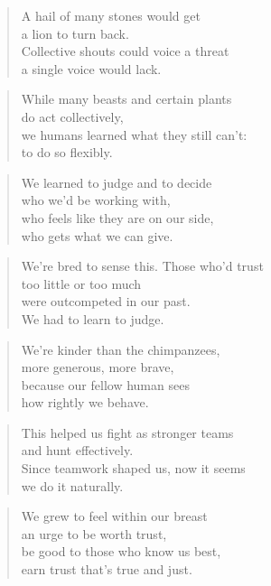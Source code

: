\documentclass[10pt,a4paper]{article}
\begin{document}
\begin{paracol}{2}
\begin{verse}
A hail of many stones would get\\
a lion to turn back.\\
Collective shouts could voice a threat\\
a single voice would lack.
\end{verse}

\begin{verse}
While many beasts and certain plants\\
do act collectively,\\
we humans learned what they still can’t:\\
to do so flexibly.
\end{verse}

\begin{verse}
We learned to judge and to decide\\
who we’d be working with,\\
who feels like they are on our side,\\
who gets what we can give.
\end{verse}

\begin{verse}
We’re bred to sense this. Those who’d trust\\
too little or too much\\
were outcompeted in our past.\\
We had to learn to judge.
\end{verse}

\begin{verse}
We’re kinder than the chimpanzees,\\
more generous, more brave,\\
because our fellow human sees\\
how rightly we behave.
\end{verse}

\begin{verse}
This helped us fight as stronger teams\\
and hunt effectively.\\
Since teamwork shaped us, now it seems\\
we do it naturally.
\end{verse}

\begin{verse}
We grew to feel within our breast\\
an urge to be worth trust,\\
be good to those who know us best,\\
earn trust that’s true and just.
\end{verse}


\end{paracol}
\end{document}
